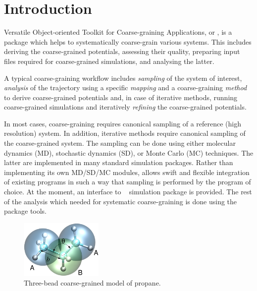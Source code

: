 \chapter{Introduction}


Versatile Object-oriented Toolkit for Coarse-graining Applications, or \votca, is a package which helps to systematically coarse-grain various systems. This includes  deriving the coarse-grained potentials, assessing their quality, preparing input files required for coarse-grained simulations, and analysing the latter.

A typical coarse-graining workflow includes {\em sampling} of the system of interest, {\em analysis} of the trajectory using a specific {\em mapping} and a coarse-graining {\em method} to derive coarse-grained potentials and, in case of iterative methods, running coarse-grained simulations and iteratively {\em refining} the coarse-grained potentials.

In most cases, coarse-graining requires canonical sampling of a reference (high resolution) system. In addition, iterative methods require canonical sampling of the coarse-grained system. The sampling can be done using either molecular dynamics (MD), stochastic dynamics (SD), or Monte Carlo (MC) techniques. The latter are implemented in many standard simulation packages. Rather than implementing its own MD/SD/MC modules, \votca allows swift and flexible integration of existing  programs in such a way that sampling is performed by the program of choice. At the moment, an interface to \gromacs~\cite{gromacs4} simulation package is provided. The rest of the analysis which needed for systematic coarse-graining is done using the package tools.

\begin{figure}
 \includegraphics[width=4cm]{fig/propane}
 \caption{\small Three-bead coarse-grained model of propane.
 \label{fig:intro:propane}
}
\end{figure}

